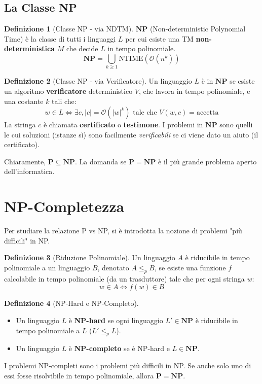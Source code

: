 \documentclass[a4paper]{article}
\theoremstyle{definition} %
\newtheorem{definition}{Definizione}
\newcommand{\bigO}[1]{\mathcal{O}(#1)}
\newcommand{\reducep}{\le_p}
\begin{document}
\subsection{La Classe NP}
\begin{definition}[Classe NP - via NDTM]
$\mathbf{NP}$ (Non-deterministic Polynomial Time) è la classe di tutti i linguaggi $L$ per cui esiste una TM \textbf{non-deterministica} $M$ che decide $L$ in tempo polinomiale.
$$ \mathbf{NP} = \bigcup_{k \ge 1} \text{NTIME}(\bigO{n^k}) $$
\end{definition}
\begin{definition}[Classe NP - via Verificatore]
Un linguaggio $L$ è in $\mathbf{NP}$ se esiste un algoritmo \textbf{verificatore} deterministico $V$, che lavora in tempo polinomiale, e una costante $k$ tali che:
$$ w \in L \iff \exists c, |c| = \bigO{|w|^k} \text{ tale che } V(w, c) = \text{accetta} $$
La stringa $c$ è chiamata \textbf{certificato} o \textbf{testimone}. I problemi in $\mathbf{NP}$ sono quelli le cui soluzioni (istanze sì) sono facilmente \emph{verificabili} se ci viene dato un aiuto (il certificato).
\end{definition}
Chiaramente, $\mathbf{P} \subseteq \mathbf{NP}$. La domanda se $\mathbf{P} = \mathbf{NP}$ è il più grande problema aperto dell'informatica.

\section{NP-Completezza}
Per studiare la relazione P vs NP, si è introdotta la nozione di problemi "più difficili" in NP.
\begin{definition}[Riduzione Polinomiale]
Un linguaggio $A$ è riducibile in tempo polinomiale a un linguaggio $B$, denotato $A \reducep B$, se esiste una funzione $f$ calcolabile in tempo polinomiale (da un trasduttore) tale che per ogni stringa $w$:
$$ w \in A \iff f(w) \in B $$
\end{definition}
\begin{definition}[NP-Hard e NP-Completo]
\begin{itemize}
    \item Un linguaggio $L$ è \textbf{NP-hard} se ogni linguaggio $L' \in \mathbf{NP}$ è riducibile in tempo polinomiale a $L$ ($L' \reducep L$).
    \item Un linguaggio $L$ è \textbf{NP-completo} se è NP-hard e $L \in \mathbf{NP}$.
\end{itemize}
\end{definition}
I problemi NP-completi sono i problemi più difficili in NP. Se anche solo uno di essi fosse risolvibile in tempo polinomiale, allora $\mathbf{P} = \mathbf{NP}$.
\end{document}

